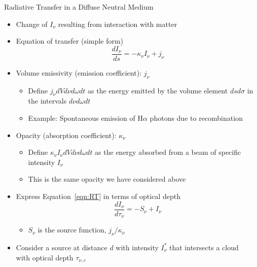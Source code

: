 \documentclass[12pt,letterpaper]{article}
\begin{document}
\begin{Aenumerate}
{\bf \item Radiative Transfer in a Diffuse Neutral Medium}
 \begin{itemize}
  \item Change of $I_\nu$ resulting from interaction with matter
  \item Equation of transfer (simple form)
	\begin{equation}
	\frac{dI_\nu}{ds} = - \kappa_\nu I_\nu + j_\nu
	\label{eqn:RT}
	\end{equation}
  \item Volume emissivity (emission coefficient): \quad $j_\nu$
	\begin{itemize}
	\item Define $j_\nu dV d\nu d\omega dt$ as the energy emitted
	by the volume element $ds d\sigma$ in the intervals $d\nu d\omega dt$
	\item Example: Spontaneous emission of H$\alpha$ photons due to
	recombination
	\end{itemize}
  \item Opacity (absorption coefficient): \quad $\kappa_\nu$
	\begin{itemize}
	\item Define $\kappa_\nu I_\nu dV d\nu d\omega dt$ as the energy
	absorbed from a beam of specific intensity $I_\nu$
	\item This is the same opacity we have considered above
	\end{itemize}
  \item Express Equation~\ref{eqn:RT} in terms of optical depth
	\begin{equation}
	\frac{dI_\nu}{d\tau_\nu} = -S_\nu + I_\nu
	\end{equation}
	\begin{itemize}
	\item $S_\nu$ is the source function, $j_\nu/\kappa_\nu$
	\end{itemize}
  \item Consider a source at distance $d$ with intensity $I_\nu^*$ that
	intersects a cloud \\ with optical depth $\tau_{\nu,c}$
	\begin{itemize}

\end{itemize}
\end{itemize}
\end{Aenumerate}
\end{document}
